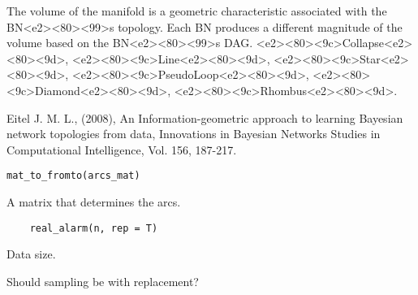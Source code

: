 \documentclass[letterpaper]{book}
\begin{document}
%
\begin{Details}\relax
The volume of the manifold is a geometric characteristic associated with the BN<e2><80><99>s topology. Each BN produces a different magnitude of the volume based on the BN<e2><80><99>s DAG.
<e2><80><9c>Collapse<e2><80><9d>, <e2><80><9c>Line<e2><80><9d>, <e2><80><9c>Star<e2><80><9d>, <e2><80><9c>PseudoLoop<e2><80><9d>, <e2><80><9c>Diamond<e2><80><9d>, <e2><80><9c>Rhombus<e2><80><9d>.
\end{Details}
%
\begin{References}\relax
Eitel J. M. L., (2008), An Information-geometric approach to learning Bayesian network topologies from data, Innovations in Bayesian Networks Studies in Computational Intelligence, Vol. 156, 187-217.
\end{References}
%
\begin{Usage}
\begin{verbatim}
mat_to_fromto(arcs_mat)
\end{verbatim}
\end{Usage}
%
\begin{Arguments}
\begin{ldescription}
\item[\code{arcs\_mat}]  A matrix that determines the arcs. 
\end{ldescription}
\end{Arguments}
%
\begin{Usage}
\begin{verbatim}
	real_alarm(n, rep = T)
\end{verbatim}
\end{Usage}
%
\begin{Arguments}
\begin{ldescription}
\item[\code{n}]  Data size. 
\item[\code{rep}]  Should sampling be with replacement? 
\end{ldescription}
\end{Arguments}
\end{document}
